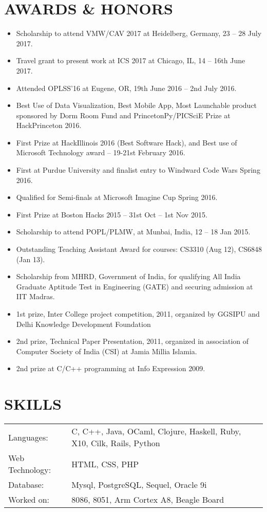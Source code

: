 \documentclass[10pt]{article}
\begin{document}
\section*{AWARDS \& HONORS}
\begin{itemize}
\itemsep-0.2em
\item Scholarship to attend VMW/CAV 2017 at Heidelberg, Germany, 23 -- 28 July 2017.
\item Travel grant to present work at ICS 2017 at Chicago, IL, 14 -- 16th June 2017. 
\item Attended OPLSS'16 at Eugene, OR, 19th June 2016 – 2nd July 2016.
\item Best Use of Data Visualization, Best Mobile App, Most Launchable product sponsored by Dorm Room Fund and PrincetonPy/PICSciE Prize at HackPrinceton 2016.
\item First Prize at HackIllinois 2016 (Best Software Hack), and 
Best use of Microsoft Technology award – 19-21st February 2016.
\item First at Purdue University and finalist entry to Windward Code Wars Spring 2016.
\item Qualified for Semi-finals at Microsoft Imagine Cup Spring 2016.
\item First Prize at Boston Hacks 2015 – 31st Oct – 1st Nov 2015.
\item Scholarship to attend POPL/PLMW, at Munbai, India, 12 -- 18 Jan 2015.
\item Outstanding Teaching Assistant Award for courses: CS3310 (Aug 12), CS6848 (Jan 13).
\item Scholarship from MHRD, Government of India, for qualifying All India Graduate
Aptitude Test in Engineering (GATE) and securing admission at IIT Madras.
\item 1st prize, Inter College project competition, 2011, organized by GGSIPU and Delhi
Knowledge Development Foundation
\item 2nd prize, Technical Paper Presentation, 2011, organized in association of Computer
Society of India (CSI) at Jamia Millia Islamia.
\item 2nd prize at C/C++ programming at Info Expression 2009.
\end{itemize}





\section*{SKILLS}
\begin{tabular}{ll}
Languages:	&	 C, C++, Java, OCaml, Clojure, Haskell, Ruby, X10, Cilk, Rails, Python	\\
Web Technology:	&	 HTML, CSS, PHP								\\
Database:	&	 Mysql, PostgreSQL, Sequel, Oracle 9i					\\
Worked on:	&	 8086, 8051, Arm Cortex A8, Beagle Board				\\
\end{tabular}
\end{document}
